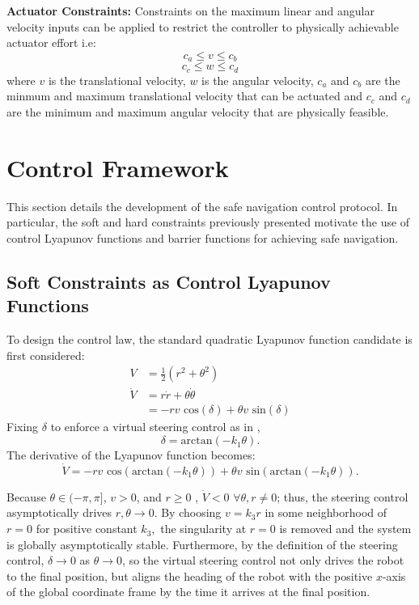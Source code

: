 \documentclass[journal]{IEEEtran}
\begin{document}
\textbf{Actuator Constraints:} Constraints on the maximum linear and angular velocity inputs can be applied to restrict the controller to physically achievable actuator effort i.e:
\begin{equation} c_a \leq v  \leq c_b \end{equation}
\begin{equation} c_c \leq w \leq c_d \end{equation}
where $v$ is the translational velocity, $w$ is the angular velocity, $c_a$ and $c_b$ are the minmum and maximum translational velocity that can be actuated and $c_c$ and $c_d$ are the minimum and maximum angular velocity that are physically feasible.

\section{Control Framework}
This section details the development of the safe navigation control protocol. In particular, the soft and hard constraints previously presented motivate the use of control Lyapunov functions and barrier functions for achieving safe navigation.

\subsection{Soft Constraints as Control Lyapunov Functions}
To design the control law, the standard quadratic Lyapunov function candidate is first considered:
\begin{align}
V&=\frac{1}{2}(r^2+\theta^2)\\
\dot{V}&=r \dot{r}+\theta \dot{\theta}\\
&=-r v \text{ cos}(\delta) + \theta v \text{ sin}(\delta)
\end{align}
Fixing $\delta$ to enforce a virtual steering control as in \cite{park2011}, 
\begin{equation} 
\delta = \text{arctan}(-k_1\theta). \end{equation}
The derivative of the Lyapunov function becomes:
\begin{equation}
\dot{V}=-r v \text{ cos}(\text{arctan}(-k_1\theta)) + \theta v \text{ sin}(\text{arctan}(-k_1\theta)).
\end{equation} 

Because $\theta\in (-\pi,\pi]$, $v>0$, and $r\geq 0$ , $\dot{V}<0$ $\forall \theta,r\neq0$; thus, the steering control asymptotically drives $r,\theta\to 0$. By choosing $v=k_3 r$ in some neighborhood of $r=0$ for positive constant $k_3,$ the singularity at $r=0$ is removed and the system is globally asymptotically stable. Furthermore, by the definition of the steering control, $\delta\to 0$ as $\theta \to 0$, so the virtual steering control not only drives the robot to the final position, but aligns the heading of the robot with the positive $x$-axis of the global coordinate frame by the time it arrives at the final position. 
\end{document}
